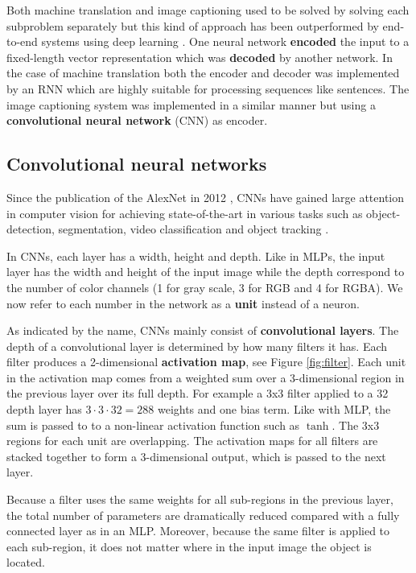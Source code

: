 Both machine translation and image captioning used to be solved by solving each subproblem separately but this kind of approach has been outperformed by end-to-end systems using deep learning \cite{ShowAndTell}. One neural network \textbf{encoded} the input to a fixed-length vector representation which was \textbf{decoded} by another network. In the case of machine translation both the encoder and decoder was implemented by an RNN which are highly suitable for processing sequences like sentences. The image captioning system was implemented in a similar manner but using a \textbf{convolutional neural network} (CNN) as encoder.


\subsection{Convolutional neural networks}

Since the publication of the AlexNet in 2012 \cite{AlexNet}, CNNs have gained large attention in computer vision for achieving state-of-the-art in various tasks such as object-detection, segmentation, video classification and object tracking \cite{InceptionV3}.




In CNNs, each layer has a width, height and depth. Like in MLPs, the input layer has the width and height of the input image while the depth correspond to the number of color channels (1 for gray scale, 3 for RGB and 4 for RGBA). We now refer to each number in the network as a \textbf{unit} instead of a neuron.

As indicated by the name, CNNs mainly consist of \textbf{convolutional layers}. The depth of a convolutional layer is determined by how many filters it has. Each filter produces a 2-dimensional \textbf{activation map}, see Figure \ref{fig:filter}. Each unit in the activation map comes from a weighted sum over a 3-dimensional region in the previous layer over its full depth. For example a 3x3 filter applied to a 32 depth layer has $3 \cdot 3 \cdot 32=288$ weights and one bias term.
Like with MLP, the sum is passed to to a non-linear activation function such as $\tanh$. The 3x3 regions for each unit are overlapping.
The activation maps for all filters are stacked together to form a 3-dimensional output, which is passed to the next layer.

Because a filter uses the same weights for all sub-regions in the previous layer, the total number of parameters are dramatically reduced compared with a fully connected layer as in an MLP. Moreover, because the same filter is applied to each sub-region, it does not matter where in the input image the object is located.

